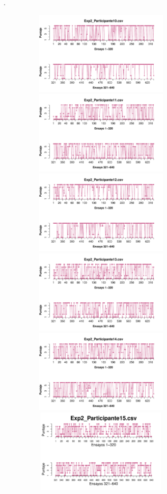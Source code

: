 \documentclass[a4paper ]{article}
\begin{document}
\vfill .
\begin{figure}[th]
\begin{center}
\includegraphics[width=8cm, height=4cm]{Figures/Rating_Exp2_P10} \includegraphics[width=8cm, height=4cm]{Figures/Rating_Exp2_P11} \includegraphics[width=8cm, height=4cm]{Figures/Rating_Exp2_P12}
\includegraphics[width=8cm, height=4cm]{Figures/Rating_Exp2_P13} \includegraphics[width=8cm, height=4cm]{Figures/Rating_Exp2_P14} \includegraphics[width=8cm, height=4cm]{Figures/Rating_Exp2_P15}

\end{center}
\end{figure}
\end{document}
